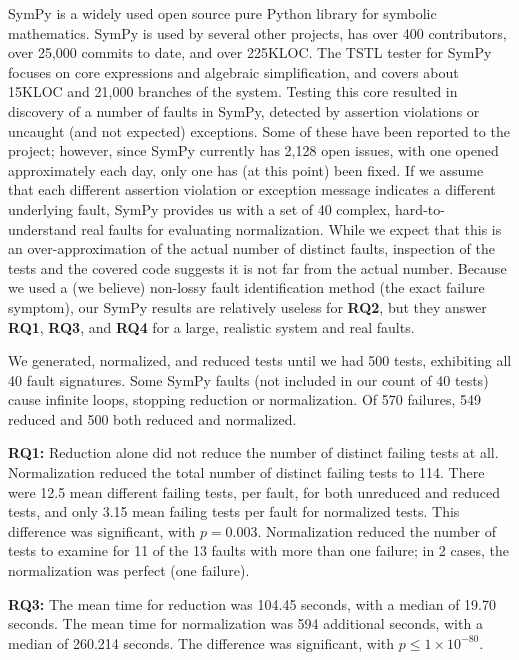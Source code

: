 SymPy \cite{SymPy} is a widely used open source pure Python library
for symbolic mathematics.  SymPy is used by several other projects,
has over 400 contributors, over 25,000 commits to date, and over
225KLOC.  The TSTL tester for SymPy focuses on core expressions and
algebraic simplification, and covers about 15KLOC and 21,000 branches of
the system.  Testing this core resulted in discovery of a number
of faults in SymPy, detected by assertion violations or uncaught (and
not expected) exceptions.  Some of these have been reported to the project;
however, since SymPy currently has 2,128 open issues, with one opened
approximately each day, only one has (at this point) been fixed.  If we assume that
each different assertion violation or exception message indicates a
different underlying fault, SymPy provides us with a set of 40
complex, hard-to-understand real faults for evaluating normalization.
While we expect that this is an over-approximation of the actual
number of distinct faults, inspection of the tests and the covered
code suggests it is not far from the actual number.  Because we used a
(we believe)
non-lossy fault identification method (the exact failure symptom), our
SymPy results are relatively useless for {\bf RQ2}, but they answer {\bf RQ1}, {\bf RQ3}, and {\bf RQ4} for a large, realistic
system and real faults.

We generated, normalized, and reduced tests until we had 500 tests,
exhibiting all 40 fault signatures.    Some SymPy faults (not
included in our count of 40 tests) cause infinite loops, stopping
reduction or normalization. Of 570 failures, 549 reduced
and 500 both reduced and normalized.

{\bf RQ1:} Reduction alone did not reduce the number of distinct failing tests at
all.  Normalization reduced the total number of distinct
failing tests to 114.  There were
12.5 mean different failing tests, per fault, for both unreduced and
reduced tests, and only 3.15 mean failing tests per fault for
normalized tests.  This difference was significant, with $p=0.003$.
Normalization reduced the number of tests to
examine for 11 of the 13 faults with more than one failure; in 2 cases, the normalization was perfect (one failure).

{\bf RQ3:} The mean time for reduction was 104.45 seconds, with a
median of 19.70 seconds.  The mean time for normalization was
594 additional seconds, with a median of 260.214 seconds.  The
difference was significant, with $p\leq1\times10^{-80}$.

